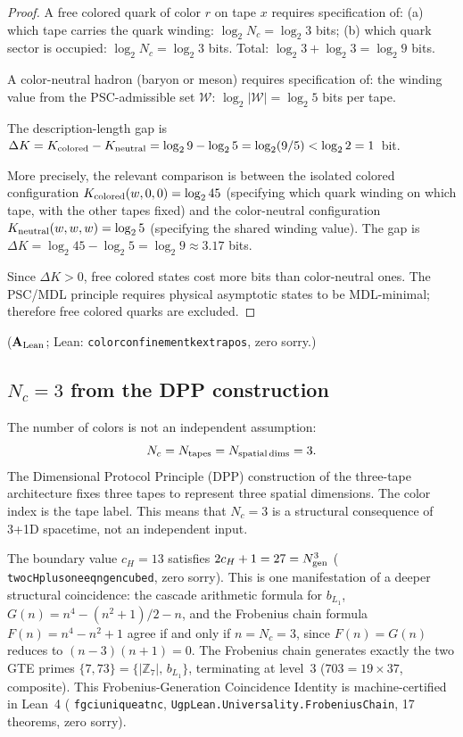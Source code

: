\documentclass[11pt]{article}
\theoremstyle{remark}
\newcommand{\lean}[1]{%
  \penalty-100
  \begingroup\def\_{\textunderscore\allowbreak}\texttt{#1}\endgroup}
\newcommand{\CatAL}{\ensuremath{\textbf{A}_{\rm Lean}}}
\begin{document}
\begin{proof}
A free colored quark of color $r$ on tape $x$ requires specification of:
(a) which tape carries the quark winding: $\log_2 N_c = \log_2 3$ bits;
(b) which quark sector is occupied: $\log_2 N_c = \log_2 3$ bits.
Total: $\log_2 3 + \log_2 3 = \log_2 9$ bits.

A color-neutral hadron (baryon or meson) requires specification of:
the winding value from the PSC-admissible set $\mathcal{W}$:
$\log_2|\mathcal{W}| = \log_2 5$ bits per tape.

The description-length gap is
$\Delta K = K_{\rm colored} - K_{\rm neutral} = \log_2 9 - \log_2 5
= \log_2(9/5) < \log_2 2 = 1$~bit.

More precisely, the relevant comparison is between the isolated colored configuration
$K_{\rm colored}(w,0,0) = \log_2 45$ (specifying which quark winding on which tape,
with the other tapes fixed) and the color-neutral configuration
$K_{\rm neutral}(w,w,w) = \log_2 5$ (specifying the shared winding value).
The gap is $\Delta K = \log_2 45 - \log_2 5 = \log_2 9 \approx 3.17$ bits.

Since $\Delta K > 0$, free colored states cost more bits than color-neutral ones.
The PSC/MDL principle requires physical asymptotic states to be MDL-minimal;
therefore free colored quarks are excluded.
\end{proof}

($\CatAL$; Lean: \lean{color\_confinement\_k\_extra\_pos}, zero sorry.)

\subsection{$N_c = 3$ from the DPP construction}
\label{ssec:nc3}

The number of colors is not an independent assumption:
\[
  N_c = N_{\rm tapes} = N_{\rm spatial\,dims} = 3.
\]
The Dimensional Protocol Principle (DPP) construction of the three-tape architecture
fixes three tapes to represent three spatial dimensions. The color index is
the tape label. This means that $N_c = 3$ is a structural consequence of
3+1D spacetime, not an independent input.

\smallskip
\noindent The boundary value $c_H = 13$ satisfies $2c_H + 1 = 27 = N_{\rm gen}^3$ (\lean{two\_cH\_plus\_one\_eq\_ngen\_cubed}, zero sorry).  This is one manifestation of a deeper structural coincidence: the cascade arithmetic formula for $b_{L_1}$, $G(n) = n^4 - (n^2+1)/2 - n$, and the Frobenius chain formula $F(n) = n^4 - n^2 + 1$ agree if and only if $n = N_c = 3$, since $F(n) = G(n)$ reduces to $(n-3)(n+1) = 0$.  The Frobenius chain generates exactly the two GTE primes $\{7, 73\} = \{|\mathbb{Z}_7|,\, b_{L_1}\}$, terminating at level~3 ($703 = 19 \times 37$, composite).  This Frobenius-Generation Coincidence Identity is machine-certified in Lean~4 (\lean{fgci\_unique\_at\_nc}, \texttt{UgpLean.Universality.FrobeniusChain}, 17 theorems, zero sorry).
\end{document}
